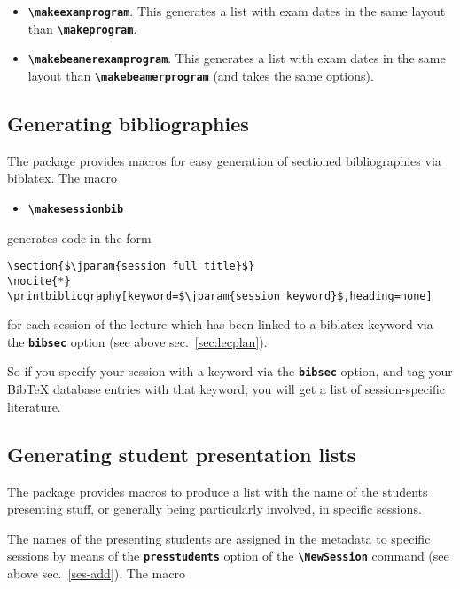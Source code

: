 \documentclass[english]{article}
\newcommand*\jmacro[1]{\textbf{\texttt{#1}}}
\newcommand*\jcsmacro[1]{\jmacro{\textbackslash{#1}}}
\newcommand*\joption[1]{\textbf{\texttt{#1}}}
\newcommand*\jparam[1]{\angus #1\angud}
\begin{document}
\begin{itemize}
	\item \jcsmacro{makeexamprogram}. This generates a list with exam dates in the same layout
	      than \jcsmacro{makeprogram}.
	\item \jcsmacro{makebeamerexamprogram}. This generates a list with exam dates in the same layout
	      than \jcsmacro{makebeamerprogram} (and takes the same options).
\end{itemize}

\subsection{Generating bibliographies\label{sub:bibliographies}}

The package provides macros for easy generation of sectioned bibliographies
via \textsf{biblatex}. The macro
\begin{itemize}
\item \jcsmacro{makesessionbib}
\end{itemize}
generates code in the form
\begin{lstlisting}[basicstyle={\small\ttfamily},frame=single,
                   escapechar=\$,moretexcs={[1]{printbibliography}}]
\section{$\jparam{session full title}$}
\nocite{*}
\printbibliography[keyword=$\jparam{session keyword}$,heading=none]
\end{lstlisting}
 for each session of the lecture which has been linked to a \textsf{biblatex}
keyword via the \joption{bibsec} option (see above sec.~\ref{sec:lecplan}).

So if you specify your session with a keyword via the \joption{bibsec}
option, and tag your Bib\TeX{} database entries with that keyword,
you will get a list of session-specific literature.


\subsection{Generating student presentation lists}\label{sec:preslists}

The package provides macros to produce a list with the name of the students presenting
stuff, or generally being particularly involved, in specific sessions.

The names of the presenting students are assigned in the metadata to specific sessions
by means of the \joption{presstudents} option of the \jcsmacro{NewSession} command
(see above sec.~\ref{ses-add}). The macro
\end{document}
